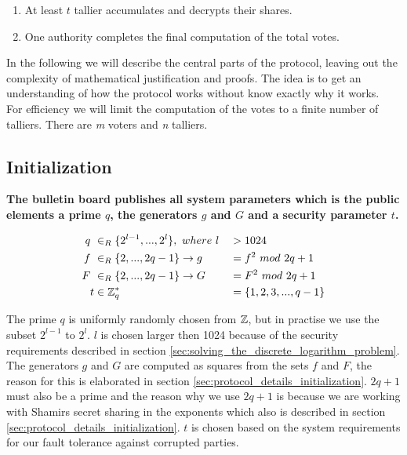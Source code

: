 \begin{enumerate}
        \begin{enumerate}
            \item At least $t$ tallier accumulates and decrypts their shares.
            
            \item One authority completes the final computation of the total votes.
        \end{enumerate}
\end{enumerate}


\noindent
In the following we will describe the central parts of the protocol, leaving out the complexity of mathematical justification and proofs. The idea is to get an understanding of how the protocol works without know exactly why it works. \\

\noindent
For efficiency we will limit the computation of the votes to a finite number of talliers. There are \textit{m} voters and \textit{n} talliers.
\subsection{Initialization}   \label{sec:the_protocol_initialization}

\noindent
\textbf{The bulletin board publishes all system parameters which is the public elements a prime $q$,  the generators $g$ and $G$ and a security parameter $t$.}


\begin{alignat*}{2}
q \ &\in_R \{2^{l-1},...,2^{l}\}, \ where\  l &&> 1024 \\
f \ &\in_R \{2,...,2q-1\} \rightarrow g &&= f^2 \ mod\ 2q+1  \\
F \ &\in_R \{2,...,2q-1\}\rightarrow G &&= F^2 \ mod\ 2q+1 \\
t &\in \Z_q^* &&= \{1,2,3,...,q-1\} 
\end{alignat*}

\noindent
The prime $q$ is uniformly randomly chosen from $\mathbb{Z}$, but in practise we use the subset $2^{l-1}$ to $2^l$. $l$ is chosen  larger then 1024 because of the security requirements described in section \ref{sec:solving_the_discrete_logarithm_problem}. The generators $g$ and $G$ are computed as squares from the sets $f$ and $F$, the reason for this is elaborated in section \ref{sec:protocol_details_initialization}.  $2q+1$ must also be a prime and the reason why we use $2q +1$ is because we are working with Shamirs secret sharing in the exponents which also is described in section \ref{sec:protocol_details_initialization}. $t$ is chosen based on the system requirements for our fault tolerance against corrupted parties.\\

